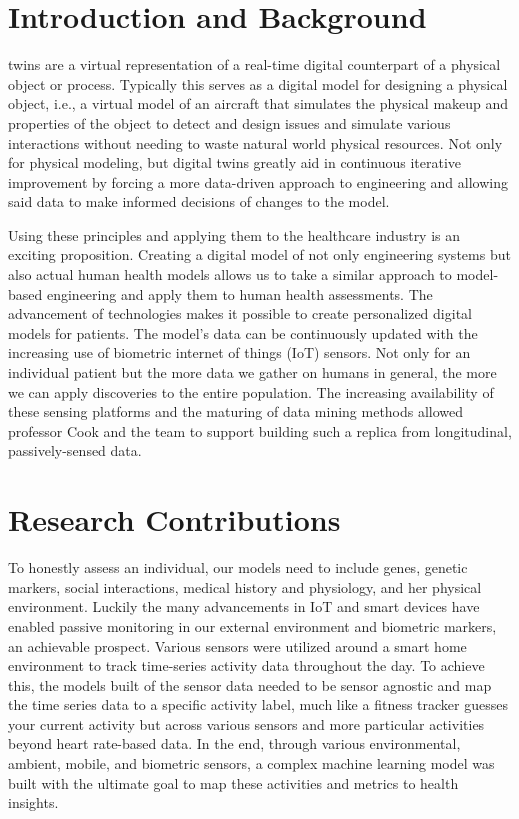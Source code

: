 \documentclass[journal,onecolumn]{IEEEtran}
\begin{document}
\section{Introduction and Background}

 twins are a virtual representation of a real-time digital counterpart of a physical object or process. Typically this serves as a digital model for designing a physical object, i.e., a virtual model of an aircraft that simulates the physical makeup and properties of the object to detect and design issues and simulate various interactions without needing to waste natural world physical resources. Not only for physical modeling, but digital twins greatly aid in continuous iterative improvement by forcing a more data-driven approach to engineering and allowing said data to make informed decisions of changes to the model. 

Using these principles and applying them to the healthcare industry is an exciting proposition. Creating a digital model of not only engineering systems but also actual human health models allows us to take a similar approach to model-based engineering and apply them to human health assessments. The advancement of technologies makes it possible to create personalized digital models for patients. The model's data can be continuously updated with the increasing use of biometric internet of things (IoT) sensors. Not only for an individual patient but the more data we gather on humans in general, the more we can apply discoveries to the entire population. The increasing availability of these sensing platforms and the maturing of data mining methods allowed professor Cook and the team to support building such a replica from longitudinal, passively-sensed data. 

\section{Research Contributions}

To honestly assess an individual, our models need to include genes, genetic markers, social interactions, medical history and physiology, and her physical environment. Luckily the many advancements in IoT and smart devices have enabled passive monitoring in our external environment and biometric markers, an achievable prospect. Various sensors were utilized around a smart home environment to track time-series activity data throughout the day. To achieve this, the models built of the sensor data needed to be sensor agnostic and map the time series data to a specific activity label, much like a fitness tracker guesses your current activity but across various sensors and more particular activities beyond heart rate-based data. In the end, through various environmental, ambient, mobile, and biometric sensors, a complex machine learning model was built with the ultimate goal to map these activities and metrics to health insights. 
\end{document}
